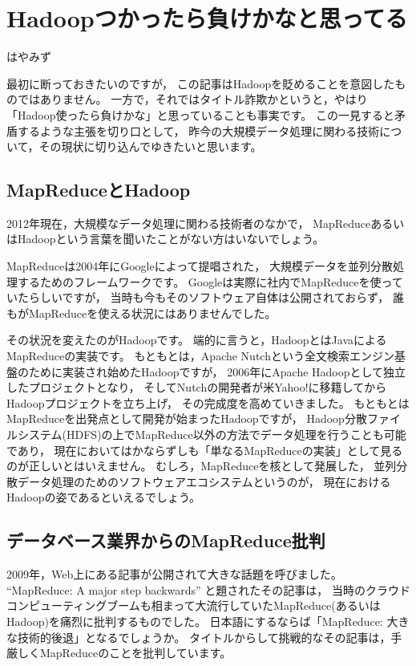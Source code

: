 
\chapter{Hadoopつかったら負けかなと思ってる}

\begin{flushright}
 {\headfont はやみず}
\end{flushright}

最初に断っておきたいのですが，
この記事はHadoopを貶めることを意図したものではありません。
一方で，それではタイトル詐欺かというと，やはり「Hadoop使ったら負けかな」と思っていることも事実です。
この一見すると矛盾するような主張を切り口として，
昨今の大規模データ処理に関わる技術について，その現状に切り込んでゆきたいと思います。

\section{MapReduceとHadoop}

2012年現在，大規模なデータ処理に関わる技術者のなかで，
MapReduceあるいはHadoopという言葉を聞いたことがない方はいないでしょう。

MapReduceは2004年にGoogleによって提唱された，
大規模データを並列分散処理するためのフレームワークです。
Googleは実際に社内でMapReduceを使っていたらしいですが，
当時も今もそのソフトウェア自体は公開されておらず，
誰もがMapReduceを使える状況にはありませんでした。

その状況を変えたのがHadoopです。
端的に言うと，HadoopとはJavaによるMapReduceの実装です。
もともとは，Apache Nutchという全文検索エンジン基盤のために実装され始めたHadoopですが，
2006年にApache Hadoopとして独立したプロジェクトとなり，
そしてNutchの開発者が米Yahoo!に移籍してからHadoopプロジェクトを立ち上げ，
その完成度を高めていきました。
もともとはMapReduceを出発点として開発が始まったHadoopですが，
Hadoop分散ファイルシステム(HDFS)の上でMapReduce以外の方法でデータ処理を行うことも可能であり，
現在においてはかならずしも「単なるMapReduceの実装」として見るのが正しいとはいえません。
むしろ，MapReduceを核として発展した，
並列分散データ処理のためのソフトウェアエコシステムというのが，
現在におけるHadoopの姿であるといえるでしょう。

\section{データベース業界からのMapReduce批判}

2009年，Web上にある記事が公開されて大きな話題を呼びました。
``MapReduce: A major step backwards'' と題されたその記事は，
当時のクラウドコンピューティングブームも相まって大流行していたMapReduce(あるいはHadoop)を痛烈に批判するものでした。
日本語にするならば「MapReduce: 大きな技術的後退」となるでしょうか。
タイトルからして挑戦的なその記事は，手厳しくMapReduceのことを批判しています。

